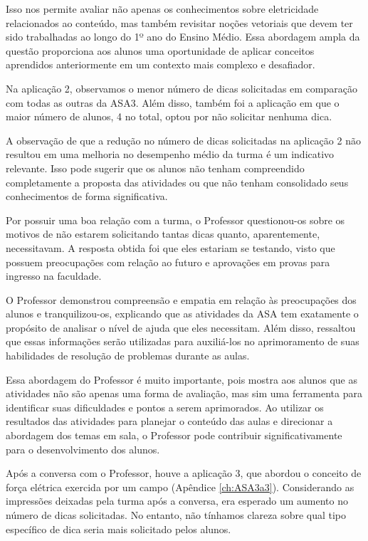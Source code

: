 Isso nos permite avaliar não apenas os conhecimentos sobre eletricidade relacionados ao conteúdo, mas também revisitar noções vetoriais que devem ter sido trabalhadas ao longo do 1º ano do Ensino Médio. Essa abordagem ampla da questão proporciona aos alunos uma oportunidade de aplicar conceitos aprendidos anteriormente em um contexto mais complexo e desafiador.

Na aplicação 2, observamos o menor número de dicas solicitadas em comparação com todas as outras da ASA3. Além disso, também foi a aplicação em que o maior número de alunos, 4 no total, optou por não solicitar nenhuma dica.

A observação de que a redução no número de dicas solicitadas na aplicação 2 não resultou em uma melhoria no desempenho médio da turma é um indicativo relevante. Isso pode sugerir que os alunos não tenham compreendido completamente a proposta das atividades ou que não tenham consolidado seus conhecimentos de forma significativa.

Por possuir uma boa relação com a turma, o Professor questionou-os sobre os motivos de não estarem solicitando tantas dicas quanto, aparentemente, necessitavam. A resposta obtida foi que eles estariam se testando, visto que possuem preocupações com relação ao futuro e aprovações em provas para ingresso na faculdade.

O Professor demonstrou compreensão e empatia em relação às preocupações dos alunos e tranquilizou-os, explicando que as atividades da ASA tem exatamente o propósito de analisar o nível de ajuda que eles necessitam. Além disso, ressaltou que essas informações serão utilizadas para auxiliá-los no aprimoramento de suas habilidades de resolução de problemas durante as aulas.

Essa abordagem do Professor é muito importante, pois mostra aos alunos que as atividades não são apenas uma forma de avaliação, mas sim uma ferramenta para identificar suas dificuldades e pontos a serem aprimorados. Ao utilizar os resultados das atividades para planejar o conteúdo das aulas e direcionar a abordagem dos temas em sala, o Professor pode contribuir significativamente para o desenvolvimento dos alunos.

Após a conversa com o Professor, houve a aplicação 3, que abordou o conceito de força elétrica exercida por um campo (Apêndice \ref{ch:ASA3a3}). Considerando as impressões deixadas pela turma após a conversa, era esperado um aumento no número de dicas solicitadas. No entanto, não tínhamos clareza sobre qual tipo específico de dica seria mais solicitado pelos alunos.

